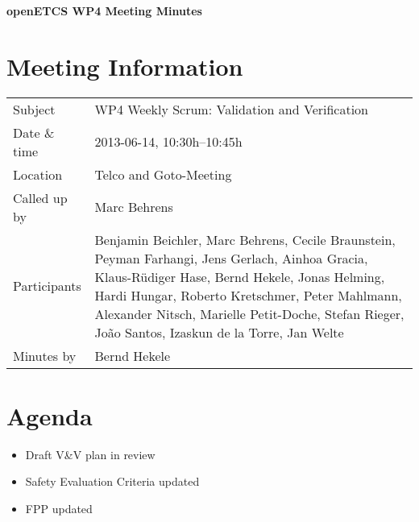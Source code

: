 \documentclass[a4paper, 11pt]{article}
\begin{document}
{\begin{center}\huge\bf openETCS WP4 Meeting Minutes\end{center}}
\section{Meeting Information}

\renewcommand{\arraystretch}{1.5}
\begin{supertabular}{m{.2\textwidth}m{.8\textwidth}}
Subject & WP4 Weekly Scrum: Validation and Verification\\
Date \& time & 2013-06-14, 10:30h--10:45h\\
Location & Telco and Goto-Meeting\\
Called up by & Marc Behrens\\
Participants &
Benjamin Beichler,
Marc Behrens,
Cecile Braunstein,
Peyman Farhangi,
Jens Gerlach,
Ainhoa Gracia,
Klaus-R\"udiger Hase,
Bernd Hekele,
Jonas Helming,
Hardi Hungar,
Roberto Kretschmer,
Peter Mahlmann,
Alexander Nitsch,
Marielle Petit-Doche,
Stefan Rieger,
Jo\~ao Santos,
Izaskun de la Torre,
Jan Welte
\\

Minutes by & Bernd Hekele\\

\end{supertabular}
\renewcommand{\arraystretch}{1.0}


\section{{Agenda}}
\begin{itemize}
\item Draft V\&V plan in review
\item Safety Evaluation Criteria updated
\item FPP updated
\end{itemize}
\end{document}
